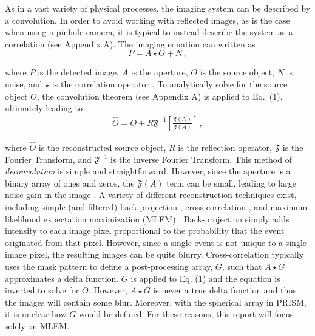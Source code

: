 \documentclass[10pt]{article}
\begin{document}
As in a vast variety of physical processes, the imaging system can be described by a convolution. In order to avoid working with reflected images, as is the case when using a pinhole camera, it is typical to instead describe the system as a correlation (see Appendix A). The imaging equation can written as
%
%
\begin{equation}
	P = A \star O + N\,,
\end{equation}

\noindent where $P$ is the detected image, $A$ is the aperture, $O$ is the source object, $N$ is noise, and $\star$ is the correlation operator \cite{FenimoreCannon1978}. To analytically solve for the source object $O$, the convolution theorem (see Appendix A) is applied to Eq.~(1), ultimately leading to 
%
\begin{align}
	\hat{O} = O + R\mathfrak{F}^{-1}\left[ \frac{\mathfrak{F}(N)}{\mathfrak{F}(A)}\right]\,,
\end{align}

\noindent where $\hat{O}$ is the reconstructed source object, $R$ is the reflection operator, $\mathfrak{F}$ is the Fourier Transform, and $\mathfrak{F}^{-1}$ is the inverse Fourier Transform. This method of \emph{deconvolution} is simple and straightforward. However, since the aperture is a binary array of ones and zeros, the $\mathfrak{F}(A)$ term can be small, leading to large noise gain in the image \cite{FenimoreCannon1978}. A variety of different reconstruction techniques exist, including simple (and filtered) back-projection \cite{Wahl2011}, cross-correlation \cite{FenimoreCannon1978}, and maximum likelihood expectation maximization (MLEM) \cite{LangeCarson1984}. Back-projection simply adds intensity to each image pixel proportional to the probability that the event originated from that pixel. However, since a single event is not unique to a single image pixel, the resulting images can be quite blurry. Cross-correlation typically uses the mask pattern to define a post-processing array, $G$, such that $A\star G$ approximates a delta function. $G$ is applied to Eq. (1) and the equation is inverted to solve for $O$. However, $A\star G$ is never a true delta function and thus the images will contain some blur. Moreover, with the spherical array in PRISM, it is unclear how $G$ would be defined. For these reasons, this report will focus solely on MLEM.
\end{document}
